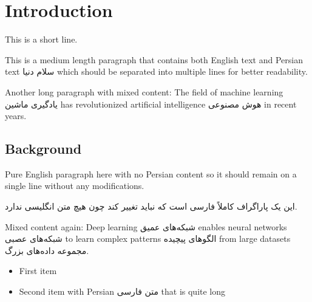 \documentclass{article}
\begin{document}
\section{Introduction}

This is a short line.

This is a medium length paragraph that contains both English text and Persian text
سلام دنیا
which should be separated into multiple lines for better readability.

Another long paragraph with mixed content: The field of machine learning
یادگیری ماشین
has revolutionized artificial intelligence
هوش مصنوعی
in recent years.

\subsection{Background}

Pure English paragraph here with no Persian content so it should remain on a single line without any modifications.

این یک پاراگراف کاملاً فارسی است که نباید تغییر کند چون هیچ متن انگلیسی ندارد.

Mixed content again: Deep learning
شبکه‌های عمیق
enables neural networks
شبکه‌های عصبی
to learn complex patterns
الگوهای پیچیده
from large datasets
مجموعه داده‌های بزرگ.

\begin{itemize}
\item First item
\item Second item with Persian
متن فارسی
that is quite long
\end{itemize}

\end{document}
